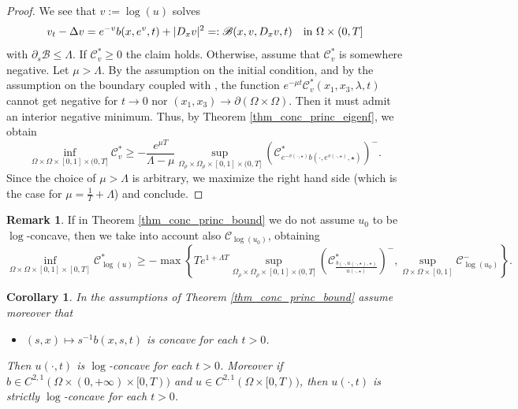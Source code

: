 \documentclass[11pt, reqno]{amsart}
\newtheorem{corollary}[lemma]{Corollary}
\theoremstyle{definition}
\newtheorem{remark}[lemma]{Remark}
\numberwithin{equation}{section}
\newcommand{\mc}[1]{\mathcal{#1}}
\begin{document}
\begin{proof}
We see that $v:=\log(u)$ solves
$$v_t - \Delta v = e^{-v} b(x, e^v, t) + |D_x v|^2 =: \mathscr{B}(x,v,D_x v, t) \quad \hbox{in $\Omega \times (0,T]$}$$
with $\partial_s \mathscr{B} \leq \Lambda$. 
If $ \mc{C}^*_v \geq 0$ the claim holds. Otherwise, assume that $ \mc{C}^*_v$ is somewhere negative. 
Let $\mu > \Lambda$. By the assumption on the initial condition, and by the assumption on the boundary coupled with \cite[Lemma 2.4]{Korevaar}, the function $e^{-\mu t}\mc{C}_v^*(x_1,x_3,\lambda, t)$ cannot get negative for $t \to 0$ nor $(x_1, x_3) \to \partial(\Omega \times \Omega)$. 
Then it must admit an interior negative minimum. 
Thus, by Theorem \ref{thm_conc_princ_eigenf}, we obtain
$$
 \inf_{\Omega \times \Omega \times [0,1] \times (0,T]} \mathcal{C}^*_v \geq - \frac{e^{\mu T}}{\Lambda-\mu} \sup_{\Omega_{\rho} \times \Omega_{\rho} \times [0,1] \times (0,T]} \left(\mc{C}^*_{e^{-v(\cdot, \star)} b(\cdot, e^{v(\cdot, \star)}, \star)}\right)^- .
$$
Since the choice of $\mu>\Lambda$ is arbitrary, we maximize the right hand side (which is the case for $\mu=\frac{1}{T}+\Lambda$) and conclude.
\end{proof}

\begin{remark}\label{rem_u0_nonconcav}
If in Theorem \ref{thm_conc_princ_bound} we do not assume $u_0$ to be $\log$-concave, then we take into account also $ \mathcal{C}_{\log(u_0)}$, obtaining
$$\inf_{\Omega \times \Omega \times [0,1] \times [0,T]} \mc{C}^*_{\log(u)} \geq -\max\left \{T e^{1+\Lambda T} \sup_{\Omega_{\rho} \times \Omega_{\rho} \times [0,1] \times (0,T]} \left(\mc{C}^*_{\frac{b(\cdot, u(\cdot, \star), \star)}{u(\cdot,\star)} }\right)^-, \sup_{\Omega \times \Omega \times [0,1]} \mathcal{C}_{\log(u_0)}^- \right\}.$$
\end{remark}

\begin{corollary}\label{corol_concav_strict}
In the assumptions of Theorem \ref{thm_conc_princ_bound} assume moreover that
\begin{itemize}
\item $(s,x) \mapsto s^{-1} b(x,s,t)$ is concave for each $t>0$.
\end{itemize}
Then $u(\cdot, t)$ is $\log$-concave for each $t>0$. Moreover if $b\in C^{2,1}(\Omega\times(0,+\infty)\times [0,T))$ and $u \in C^{2,1}(\Omega \times [0,T))$, then $u(\cdot, t)$ is strictly $\log$-concave for each $t>0$.
\end{corollary}
\end{document}
